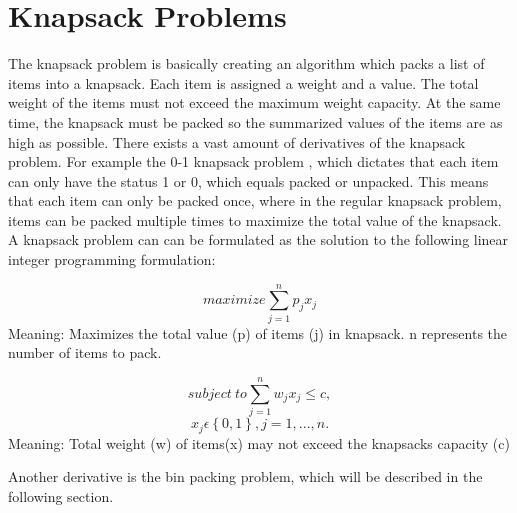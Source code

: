 \section{Knapsack Problems}
\label{sec:knapsack}
The knapsack problem is basically creating an algorithm which packs a list of items into a knapsack. Each item is assigned a weight and a value. The total weight of the items must not exceed the maximum weight capacity. At the same time, the knapsack must be packed so the summarized values of the items are as high as possible. There exists a vast amount of derivatives of the knapsack problem. For example the 0-1 knapsack problem \citep{knapsackproblems}, which dictates that each item can only have the status 1 or 0, which equals packed or unpacked. This means that each item can only be packed once, where in the regular knapsack problem, items can be packed multiple times to maximize the total value of the knapsack. A knapsack problem can can be formulated as the solution to the following linear integer programming formulation:


\[maximize \sum\limits_{j=1}^n p_jx_j\]
Meaning: Maximizes the total value (p) of items (j) in knapsack. n represents the number of items to pack.

\[subject~to \sum\limits_{j=1}^n w_jx_j\leq c,\]
\[x_j \epsilon \left \{ 0,1 \right \}, j=1,...,n.\]
Meaning: Total weight (w) of items(x) may not exceed the knapsacks capacity (c)

 \citep{knapsackproblems}
\newline
Another derivative is the bin packing problem, which will be described in the following section.